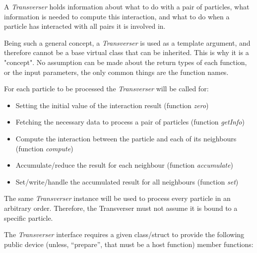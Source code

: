 \documentclass[twoside,openright,titlepage,numbers=noenddot,%
headinclude,footinclude,cleardoublepage=empty,abstract=on,
BCOR=5mm,fontsize=11pt, dvipsnames, paper=b5
]{scrreprt}
\begin{document}
A \emph{Transverser} holds information about what to do with a pair of particles, what information is needed to compute this interaction, and what to do when a particle has interacted with all pairs it is involved in.  

Being such a general concept, a \emph{Transverser} is used as a template argument, and therefore cannot be a base virtual class that can be inherited. This is why it is a "concept". No assumption can be made about the return types of each function, or the input parameters, the only common things are the function names.  

For each particle to be processed the \emph{Transverser} will be called for: %
\begin{itemize}
\item Setting the initial value of the interaction result (function \emph{zero})
\item Fetching the necessary data to process a pair of particles  (function \emph{getInfo})
\item Compute the interaction between the particle  and each of its neighbours (function \emph{compute})
\item Accumulate/reduce  the result for each neighbour (function \emph{accumulate})
\item  Set/write/handle the accumulated result for all neighbours (function \emph{set})
 \end{itemize}
The same \emph{Transverser} instance will be used to process every particle in an arbitrary order. Therefore, the Transverser must not assume it is bound to a specific particle.

The \emph{Transverser} interface requires a given class/struct to provide the following public device (unless, ``prepare'', that must be a host function) member functions:
\end{document}
